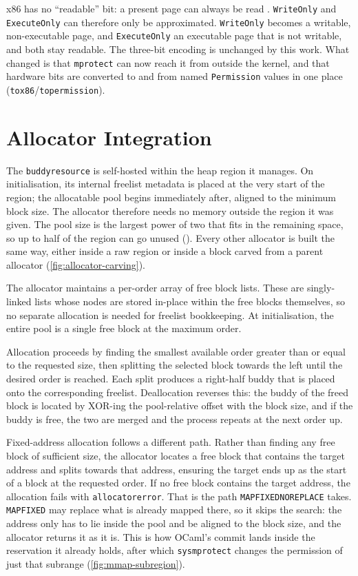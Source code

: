 \documentclass[12pt]{report}
\newcommand{\fullref}[1]{\Cref{#1}}
\renewcommand{\_}{\origunderscore\allowbreak}
\begin{document}
x86 has no ``readable'' bit: a present page can always be read \cite[Vol.~3A, Sec.~4.6]{intel-sdm}. \texttt{WriteOnly} and \texttt{ExecuteOnly} can therefore only be approximated. \texttt{WriteOnly} becomes a writable, non-executable page, and \texttt{ExecuteOnly} an executable page that is not writable, and both stay readable. The three-bit encoding is unchanged by this work. What changed is that \texttt{mprotect} can now reach it from outside the kernel, and that hardware bits are converted to and from named \texttt{Permission} values in one place (\texttt{to\_x86}/\texttt{to\_permission}).

\section{Allocator Integration}
\label{sec:allocator-integration}

The \texttt{buddy\_resource} is self-hosted within the heap region it manages. On initialisation, its internal freelist metadata is placed at the very start of the region; the allocatable pool begins immediately after, aligned to the minimum block size. The allocator therefore needs no memory outside the region it was given. The pool size is the largest power of two that fits in the remaining space, so up to half of the region can go unused (\fullref{sec:eval-arena}). Every other allocator is built the same way, either inside a raw region or inside a block carved from a parent allocator (\cref{fig:allocator-carving}).



The allocator maintains a per-order array of free block lists. These are singly-linked lists whose nodes are stored in-place within the free blocks themselves, so no separate allocation is needed for freelist bookkeeping. At initialisation, the entire pool is a single free block at the maximum order.

Allocation proceeds by finding the smallest available order greater than or equal to the requested size, then splitting the selected block towards the left until the desired order is reached. Each split produces a right-half buddy that is placed onto the corresponding freelist. Deallocation reverses this: the buddy of the freed block is located by XOR-ing the pool-relative offset with the block size, and if the buddy is free, the two are merged and the process repeats at the next order up.

Fixed-address allocation follows a different path. Rather than finding any free block of sufficient size, the allocator locates a free block that contains the target address and splits towards that address, ensuring the target ends up as the start of a block at the requested order. If no free block contains the target address, the allocation fails with \texttt{allocator\_error}. That is the path \texttt{MAP\_FIXED\_NOREPLACE} takes. \texttt{MAP\_FIXED} may replace what is already mapped there, so it skips the search: the address only has to lie inside the pool and be aligned to the block size, and the allocator returns it as it is. This is how OCaml's commit lands inside the reservation it already holds, after which \texttt{\_\_sys\_mprotect} changes the permission of just that subrange (\cref{fig:mmap-subregion}).
\end{document}
